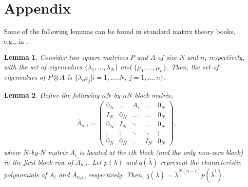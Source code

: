 \documentclass[journal]{IEEEtran}
\newtheorem{lem}{Lemma}
\begin{document}


\section*{Appendix}
Some of the following lemmas can be found in standard matrix theory books, e.g., in \cite{bhatia2013matrix}.
\begin{lem} \label{lem_eig_kron}
	Consider two square matrices $P$ and $A$ of size $N$ and $n$, respectively, with the set of eigenvalues $\{\lambda_1,\hdots,\lambda_N\}$ and $\{\mu_1,\hdots,\mu_n\}$. Then, the set of eigenvalues of $P \otimes A$ is $\{\lambda_i \mu_j| i=1,\hdots,N,~j=1,\hdots,n \}$.
\end{lem}
\begin{lem} \label{lem_polynom}
    Define the following $nN$-by-${nN}$ block matrix,
\small	\begin{align}\label{eq_aug_A}
		 \overline{A}_{n,i}= \left( 
		\begin{array}{ccccc}
			0_N & \hdots & A_{i} & \hdots & 0_N \\
			I_N &   0_N & \hdots &\hdots & 0_N\\
			0_N &  I_N & \ddots   &  \hdots   & 0_N  \\
			\vdots & \vdots & \ddots &  \ddots & \vdots \\
			0_N & 0_N &  \hdots & I_N & 0_N
		\end{array}	
		\right),
	\end{align} \normalsize
	where $N$-by-${N}$ matrix $A_{i}$ is located at the $i$th block (and the only non-zero block) in the first block-row of $\overline{A}_{n,i}$. Let $p(\lambda)$ and $q(\overline{\lambda})$  represent the characteristic polynomials of $A_{i}$ and $\overline{A}_{n,i}$, respectively. Then, $q(\overline{\lambda}) = \overline{\lambda}^{N(n-i)}p(\overline{\lambda}^i)$. 
\end{lem}
\end{document}
